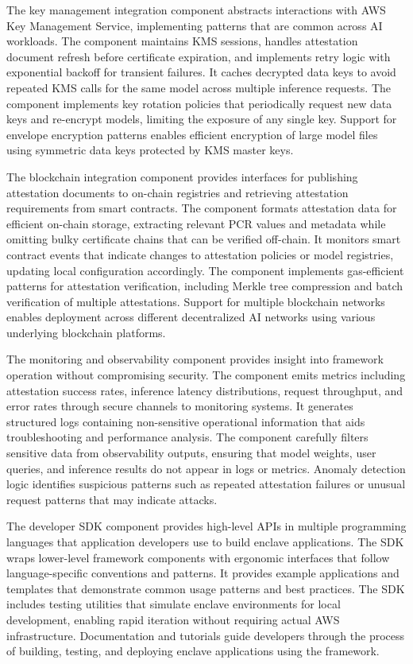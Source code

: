 The key management integration component abstracts interactions with AWS Key Management Service, implementing patterns that are common across AI workloads. The component maintains KMS sessions, handles attestation document refresh before certificate expiration, and implements retry logic with exponential backoff for transient failures. It caches decrypted data keys to avoid repeated KMS calls for the same model across multiple inference requests. The component implements key rotation policies that periodically request new data keys and re-encrypt models, limiting the exposure of any single key. Support for envelope encryption patterns enables efficient encryption of large model files using symmetric data keys protected by KMS master keys.

The blockchain integration component provides interfaces for publishing attestation documents to on-chain registries and retrieving attestation requirements from smart contracts. The component formats attestation data for efficient on-chain storage, extracting relevant PCR values and metadata while omitting bulky certificate chains that can be verified off-chain. It monitors smart contract events that indicate changes to attestation policies or model registries, updating local configuration accordingly. The component implements gas-efficient patterns for attestation verification, including Merkle tree compression and batch verification of multiple attestations. Support for multiple blockchain networks enables deployment across different decentralized AI networks using various underlying blockchain platforms.

The monitoring and observability component provides insight into framework operation without compromising security. The component emits metrics including attestation success rates, inference latency distributions, request throughput, and error rates through secure channels to monitoring systems. It generates structured logs containing non-sensitive operational information that aids troubleshooting and performance analysis. The component carefully filters sensitive data from observability outputs, ensuring that model weights, user queries, and inference results do not appear in logs or metrics. Anomaly detection logic identifies suspicious patterns such as repeated attestation failures or unusual request patterns that may indicate attacks.

The developer SDK component provides high-level APIs in multiple programming languages that application developers use to build enclave applications. The SDK wraps lower-level framework components with ergonomic interfaces that follow language-specific conventions and patterns. It provides example applications and templates that demonstrate common usage patterns and best practices. The SDK includes testing utilities that simulate enclave environments for local development, enabling rapid iteration without requiring actual AWS infrastructure. Documentation and tutorials guide developers through the process of building, testing, and deploying enclave applications using the framework.

